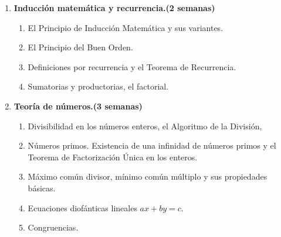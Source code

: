 \begin{refsection}
\begin{enumerate}
\begin{enumerate}
    \item Definición y ejemplos de relaciones binarias, composición, relación inversa. 
    \item Propiedades básicas: reflexividad, simetría, transitividad y antisimetría.
    \item Definiciones y ejemplos de orden parcial y total. 
    \item Relaciones de equivalencia, clases de equivalencia. La relación de congruencia módulo $n$ y los enteros modulo $n$.
    \item El conjunto cociente y particiones. La dualidad entre una partición y una relación de equivalencia.
    \item Definición y ejemplos de función.
    \item Imagen directa e inversa, operaciones con funciones, composición de funciones.
    \item Tipos particulares de funciones: función identidad, función característica, restricción y extensión de funciones, proyecciones de un producto cartesiano.
    \item Inversas laterales y función inversa. 
    \item Inyectividad, sobreyectividad, biyectividad y el criterio para la invertibilidad de una función.
    \item Cardinalidad y conjuntos contables.
\end{enumerate}

 

\item \textbf{Inducción matemática y recurrencia.(2 semanas)}

\begin{enumerate}
    \item El Principio de Inducción Matemática y sus variantes.
    \item El Principio del Buen Orden.
    \item Definiciones por
    recurrencia y el Teorema de Recurrencia.
    \item Sumatorias y productorias, el factorial.
\end{enumerate}



\item \textbf{Teoría de números.(3 semanas)}

\begin{enumerate}
    \item Divisibilidad en los números enteros, el Algoritmo de la División, 
    \item Números primos. Existencia de una infinidad de números primos y el Teorema de Factorización Única en los enteros.
    \item Máximo común divisor, mínimo común múltiplo y sus propiedades básicas.
    \item Ecuaciones diofánticas lineales $ax + by = c$.
    \item Congruencias.
\end{enumerate}




\end{enumerate}
\end{refsection}
